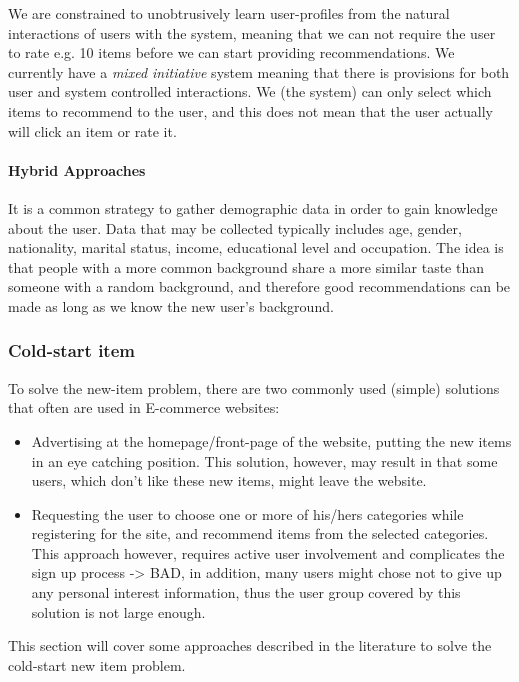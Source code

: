 We are constrained to unobtrusively learn user-profiles from the natural interactions of users with the system, meaning that we can not require the user to rate e.g. 10 items before we can start providing recommendations. We currently have a \emph{mixed initiative} system meaning that there is provisions for both user and system controlled interactions. We (the system) can only select which items to recommend to the user, and this does not mean that the user actually will click an item or rate it.

\paragraph{Hybrid Approaches}

It is a common strategy to gather demographic data in order to gain knowledge about the user. Data that may be collected typically includes age, gender, nationality, marital status, income, educational level and occupation. The idea is that people with a more common background share a more similar taste than someone with a random background, and therefore good recommendations can be made as long as we know the new user’s background.



\subsubsection{Cold-start item}

To solve the new-item problem, there are two commonly used (simple) solutions that often are used in E-commerce websites:

\begin{itemize}
\item Advertising at the homepage/front-page of the website, putting the new items in an eye catching position. This solution, however, may 		result in that some users, which don't like these new items, might leave the website.
\item Requesting the user to choose one or more of his/hers categories while registering for the site, and recommend items from the selected categories. This approach however, requires active user involvement and complicates the sign up process -> BAD, in addition, many users might chose not to give up any personal interest information, thus the user group covered by this solution is not large enough.
\end{itemize}

This section will cover some approaches described in the literature to solve the cold-start new item problem.

